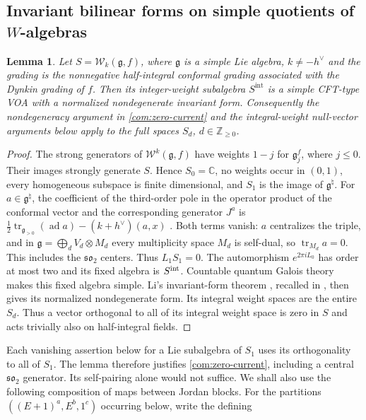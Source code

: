 \documentclass[11pt,a4paper]{amsart}
\numberwithin{equation}{section}
\newtheorem{lemma}[theorem]{Lemma}
\theoremstyle{definition}
\theoremstyle{remark}
\newcommand{\C}{\mathbb C}
\newcommand{\Z}{\mathbb Z}
\newcommand{\g}{\mathfrak g}
\newcommand{\sog}{\mathfrak{so}}
\newcommand{\tr}{\operatorname{tr}}
\newcommand{\ad}{\operatorname{ad}}
\begin{document}
\subsection{Invariant bilinear forms on simple quotients of \texorpdfstring{$W$}{W}-algebras}\label{seed:negative-families}
\begin{lemma}\label{seed:integral-form}
Let $S=\mathcal W_k(\g,f)$, where $\g$ is a simple Lie algebra,
$k\ne-h^\vee$ and the grading is the nonnegative half-integral
conformal grading associated with the Dynkin grading of $f$.
Then its integer-weight subalgebra $S^{\mathrm{int}}$ is a simple
CFT-type VOA with a normalized nondegenerate invariant form.
Consequently the nondegeneracy argument in \cref{com:zero-current} and the
integral-weight null-vector arguments below apply to the full spaces
$S_d$, $d\in\Z_{\ge0}$.
\end{lemma}
\begin{proof}
The strong generators of $\mathcal W^k(\g,f)$ have weights
$1-j$ for $\g_j^f$, where $j\le0$. Their images strongly generate
$S$. Hence $S_0=\C$, no weights occur in $(0,1)$, every homogeneous
subspace is finite dimensional, and $S_1$ is the image of $\g^\natural$.
For $a\in\g^\natural$, the coefficient of the third-order pole in the
operator product of the conformal vector and the corresponding generator $J^a$ is
$\frac12\tr_{\g_{>0}}(\ad a)-(k+h^\vee)(a,x)$
\cite[Theorem~2.1(b)]{KacWakimoto2004}. Both terms vanish:
$a$ centralizes the triple, and in
$\g=\bigoplus_d V_d\otimes M_d$ every multiplicity space $M_d$
is self-dual, so $\tr_{M_d}a=0$. This includes the $\sog_2$ centers.
Thus $L_1S_1=0$. The automorphism $e^{2\pi iL_0}$ has order at most
two and its fixed algebra is $S^{\rm int}$. Countable quantum Galois
theory \cite[arXiv v1, Theorem~5.5]{DongRenYang2024} makes this fixed algebra simple.
Li's invariant-form theorem \cite{LiForms1994}, recalled in
\cite[Proposition~4.6]{CarpiEtAl2018}, then gives its normalized nondegenerate form. Its integral weight
spaces are the entire $S_d$. Thus a vector orthogonal to all of its
integral weight space is zero in $S$ and acts trivially also on
half-integral fields.

\end{proof}
Each vanishing assertion below for a Lie subalgebra of $S_1$ uses
its orthogonality to all of $S_1$. The lemma therefore
justifies \cref{com:zero-current}, including a central $\sog_2$
generator. Its self-pairing alone would not suffice.
We shall also use the following composition of maps between Jordan blocks.
For the partitions $((E+1)^a,E^b,1^c)$ occurring below, write the defining
\end{document}
